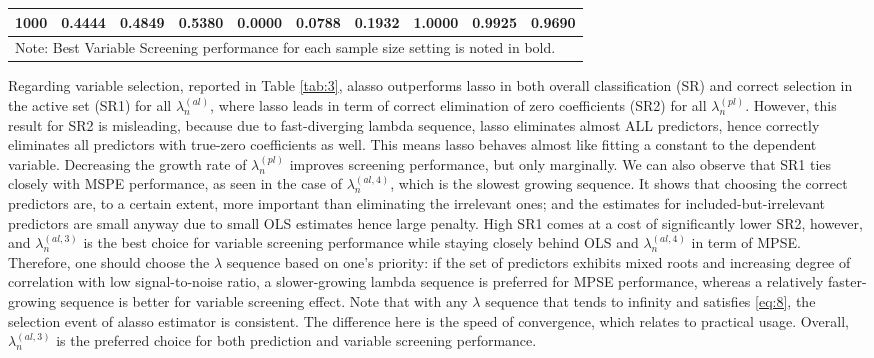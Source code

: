 \documentclass[12pt,a4paper]{article}
\begin{document}
\begin{landscape}
\begin{table}[]
\begin{tabular}{cccccccccc}
\multicolumn{1}{|c|}{1000}               & 0.4444                  & 0.4849                  & \multicolumn{1}{c|}{\textbf{0.5380}}         & 0.0000                  & 0.0788                  & \multicolumn{1}{c|}{\textbf{0.1932}}         & \textbf{1.0000}         & 0.9925                  & \multicolumn{1}{c|}{0.9690}                  \\ \hline
\multicolumn{10}{l}{Note: Best Variable Screening performance for each sample size setting is noted in bold.}                                                                                                                                                                                                                                    
\end{tabular}
\end{table}
\end{landscape}

Regarding variable selection, reported in Table \ref{tab:3}, alasso outperforms lasso in both overall classification (SR) and correct selection in the active set (SR1) for all $ \lambda_n^{(al)} $, where lasso leads in term of correct elimination of zero coefficients (SR2) for all $ \lambda_n^{(pl)} $. However, this result for SR2 is misleading, because due to fast-diverging lambda sequence, lasso eliminates almost ALL predictors, hence correctly eliminates all predictors with true-zero coefficients as well. This means lasso behaves almost like fitting a constant to the dependent variable. Decreasing the growth rate of $ \lambda_n^{(pl)} $ improves screening performance, but only marginally. We can also observe that SR1 ties closely with MSPE performance, as seen in the case of $ \lambda_n^{(al, 4)} $, which is the slowest growing sequence. It shows that choosing the correct predictors are, to a certain extent, more important than eliminating the irrelevant ones; and the estimates for included-but-irrelevant predictors are small anyway due to small OLS estimates hence large penalty. High SR1 comes at a cost of significantly lower SR2, however, and $ \lambda_n^{(al, 3)} $ is the best choice for variable screening performance while staying closely behind OLS and $ \lambda_n^{(al, 4)} $ in term of MPSE. Therefore, one should choose the $ \lambda $ sequence based on one's priority: if the set of predictors exhibits mixed roots and increasing degree of correlation with low signal-to-noise ratio, a slower-growing lambda sequence is preferred for MPSE performance, whereas a relatively faster-growing sequence is better for variable screening effect. Note that with any $ \lambda $ sequence that tends to infinity and satisfies \eqref{eq:8}, the selection event of alasso estimator is consistent. The difference here is the speed of convergence, which relates to practical usage. Overall, $ \lambda_n^{(al, 3)} $ is the preferred choice for both prediction and variable screening performance.
\end{document}
